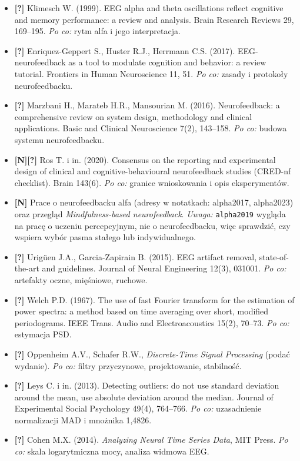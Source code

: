 \begin{itemize}
    \item \textbf{[?]} Klimesch W. (1999). EEG alpha and theta oscillations
          reflect cognitive and memory performance: a review and analysis.
          Brain Research Reviews 29, 169--195.
          \emph{Po co:} rytm alfa i jego interpretacja.
    \item \textbf{[?]} Enriquez-Geppert S., Huster R.J., Herrmann C.S. (2017).
          EEG-neurofeedback as a tool to modulate cognition and behavior:
          a review tutorial. Frontiers in Human Neuroscience 11, 51.
          \emph{Po co:} zasady i protokoły neurofeedbacku.
    \item \textbf{[?]} Marzbani H., Marateb H.R., Mansourian M. (2016).
          Neurofeedback: a comprehensive review on system design,
          methodology and clinical applications.
          Basic and Clinical Neuroscience 7(2), 143--158.
          \emph{Po co:} budowa systemu neurofeedbacku.
    \item \textbf{[N][?]} Ros T. i in. (2020). Consensus on the reporting and
          experimental design of clinical and cognitive-behavioural
          neurofeedback studies (CRED-nf checklist). Brain 143(6).
          \emph{Po co:} granice wnioskowania i opis eksperymentów.
    \item \textbf{[N]} Prace o neurofeedbacku alfa
          (adresy w notatkach: alpha2017, alpha2023) oraz przegląd
          \emph{Mindfulness-based neurofeedback}.
          \emph{Uwaga:} \texttt{alpha2019} wygląda na pracę o uczeniu
          percepcyjnym, nie o neurofeedbacku, więc sprawdzić, czy wspiera
          wybór pasma stałego lub indywidualnego.
    \item \textbf{[?]} Urigüen J.A., Garcia-Zapirain B. (2015). EEG artifact
          removal, state-of-the-art and guidelines.
          Journal of Neural Engineering 12(3), 031001.
          \emph{Po co:} artefakty oczne, mięśniowe, ruchowe.
    \item \textbf{[?]} Welch P.D. (1967). The use of fast Fourier transform
          for the estimation of power spectra: a method based on time
          averaging over short, modified periodograms.
          IEEE Trans. Audio and Electroacoustics 15(2), 70--73.
          \emph{Po co:} estymacja PSD.
    \item \textbf{[?]} Oppenheim A.V., Schafer R.W.,
          \emph{Discrete-Time Signal Processing} (podać wydanie).
          \emph{Po co:} filtry przyczynowe, projektowanie, stabilność.
    \item \textbf{[?]} Leys C. i in. (2013). Detecting outliers: do not use
          standard deviation around the mean, use absolute deviation around
          the median. Journal of Experimental Social Psychology 49(4),
          764--766. \emph{Po co:} uzasadnienie normalizacji MAD i mnożnika 1,4826.
    \item \textbf{[?]} Cohen M.X. (2014). \emph{Analyzing Neural Time Series
          Data}, MIT Press. \emph{Po co:} skala logarytmiczna mocy, analiza
          widmowa EEG.
\end{itemize}

